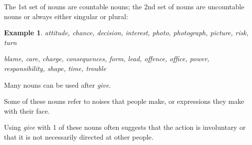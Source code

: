\documentclass[oneside]{book}
\numberwithin{equation}{section}
\newtheorem{example}{Example}[section]
\begin{document}
The 1st set of nouns are countable nouns; the 2nd set of nouns are uncountable nouns or always either singular or plural:
\begin{example}
    attitude, chance, decision, interest, photo, photograph, picture, risk, turn
    
    blame, care, charge, consequences, form, lead, offence, office, power, responsibility, shape, time, trouble
\end{example}
%
\noindent{} Many nouns can be used after \textit{give}.

%
Some of these nouns refer to noises that people make, or expressions they make with their face.

Using \textit{give} with 1 of these nouns often suggests that the action is involuntary or that it is not necessarily directed at other people.
\end{document}
